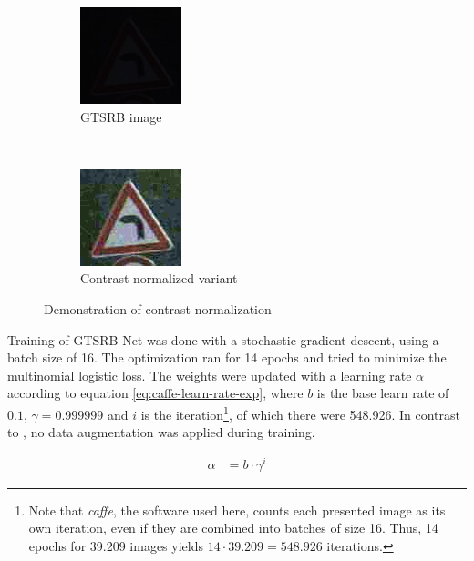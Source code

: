\documentclass[11pt, a4paper]{article}
\begin{document}
\begin{figure}[h!tb]
    \centering
    \begin{subfigure}[t]{0.45\textwidth}
    		\centering
        \includegraphics{gtsrb/problems/class19_00004_00029.jpg}
        \caption{GTSRB image}
        \label{fig:contrast-normalization-before}
    \end{subfigure}
    ~ %
    \begin{subfigure}[t]{0.45\textwidth}
    		\centering
        \includegraphics{gtsrb/problems/class19_00004_00029_normalized_contrast.jpg}
        \caption{Contrast normalized variant}
        \label{fig:contrast-normalization-after}
    \end{subfigure}
    \caption{Demonstration of contrast normalization}
    \label{fig:contrast-normalization}
\end{figure}

Training of GTSRB-Net was done with a stochastic gradient descent, using a batch size of 16. The optimization ran for 14 epochs and tried to minimize the multinomial logistic loss. The weights were updated with a learning rate $\alpha$ according to equation \eqref{eq:caffe-learn-rate-exp}, where $b$ is the base learn rate of $0.1$, $\gamma = 0.999999$ and $i$ is the iteration\footnote{Note that \emph{caffe}, the software used here, counts each presented image as its own iteration, even if they are combined into batches of size 16. Thus, 14 epochs for 39.209 images yields $14 \cdot 39.209 = 548.926$ iterations.}, of which there were 548.926. In contrast to \cite{multi-column-neural-network-gtsrb}, no data augmentation was applied during training.

\begin{align}
	\alpha &= b \cdot \gamma^i \label{eq:caffe-learn-rate-exp}
\end{align}
\end{document}
